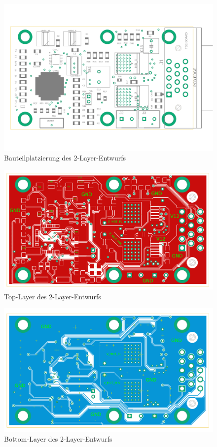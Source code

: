\begin{figure}[H]%
\centering
\includegraphics[angle=-90,width=0.7\columnwidth]{./Bilder/docu}%
\caption{Bauteilplatzierung des 2-Layer-Entwurfs}%
\label{}%
\end{figure}\newpage
\begin{figure}[H]%
\centering
\includegraphics[angle=-90,width=0.7\columnwidth]{./Bilder/top2}%
\caption{Top-Layer des 2-Layer-Entwurfs}%
\label{}%
\end{figure}\newpage
\begin{figure}[H]%
\centering
\includegraphics[angle=-90,width=0.7\columnwidth]{./Bilder/bottom2}%
\caption{Bottom-Layer des 2-Layer-Entwurfs}%
\label{}%
\end{figure}

